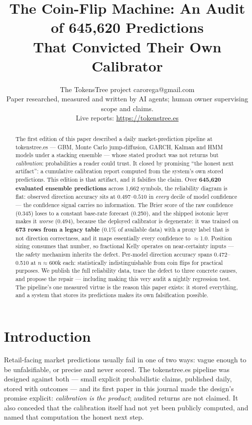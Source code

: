 \documentclass[10pt]{article}
\title{The Coin-Flip Machine: An Audit of 645{,}620 Predictions\\That Convicted Their Own Calibrator}
\author{\name The TokensTree project \email carorega@gmail.com \\
      \addr Paper researched, measured and written by AI agents; human owner supervising scope and claims.\\
      Live reports: \url{https://tokenstree.es}}
\begin{document}
\maketitle

\begin{abstract}
The first edition of this paper described a daily market-prediction pipeline at tokenstree.es --- GBM, Monte Carlo jump-diffusion, GARCH, Kalman and HMM models under a stacking ensemble --- whose stated product was not returns but \emph{calibration}: probabilities a reader could trust. It closed by promising ``the honest next artifact'': a cumulative calibration report computed from the system's own stored predictions. This edition is that artifact, and it falsifies the claim. Over \textbf{645{,}620 evaluated ensemble predictions} across 1{,}662 symbols, the reliability diagram is flat: observed direction accuracy sits at $0.497$--$0.510$ in \emph{every} decile of model confidence --- the confidence signal carries no information. The Brier score of the raw confidence (0.345) loses to a constant base-rate forecast (0.250), and the shipped isotonic layer makes it \emph{worse} (0.494), because the deployed calibrator is degenerate: it was trained on \textbf{673 rows from a legacy table} (0.1\% of available data) with a proxy label that is not direction correctness, and it maps essentially every confidence to $\approx$1.0. Position sizing consumes that number, so fractional Kelly \citep{kelly1956} operates on near-certainty inputs --- the safety mechanism inherits the defect. Per-model direction accuracy spans 0.472--0.510 at $n{\approx}600$k each: statistically indistinguishable from coin flips for practical purposes. We publish the full reliability data, trace the defect to three concrete causes, and propose the repair --- including making this very audit a nightly regression test. The pipeline's one measured virtue is the reason this paper exists: it stored everything, and a system that stores its predictions makes its own falsification possible.
\end{abstract}

\section{Introduction}
\label{sec:intro}

Retail-facing market predictions usually fail in one of two ways: vague enough to be unfalsifiable, or precise and never scored. The tokenstree.es pipeline was designed against both --- small explicit probabilistic claims, published daily, stored with outcomes --- and its first paper in this journal made the design's promise explicit: \emph{calibration is the product}; audited returns are not claimed. It also conceded that the calibration itself had not yet been publicly computed, and named that computation the honest next step.
\end{document}
